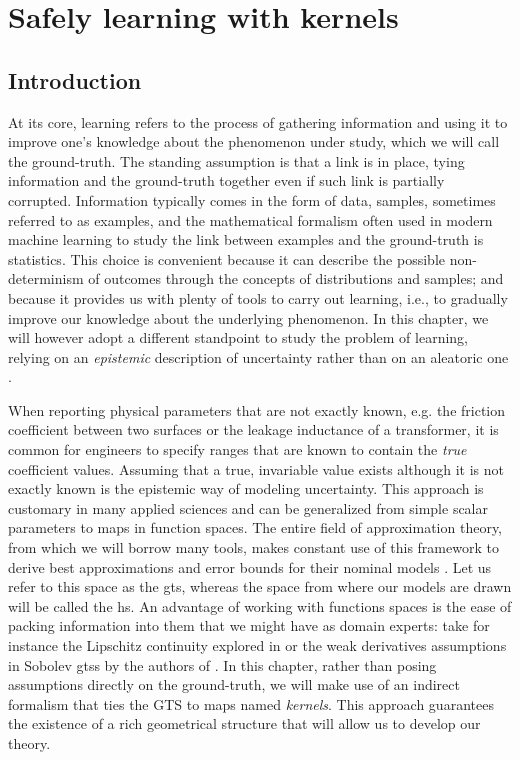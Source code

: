 \cleardoublepage
\chapter{Safely learning with kernels}

\section{Introduction}
At its core, learning refers to the process of gathering information and using it to improve one's knowledge about the phenomenon under study, which we will call the ground-truth. The standing assumption is that a link is in place, tying information and the ground-truth together even if such link is partially corrupted. Information typically comes in the form of data, samples, sometimes referred to as examples, and
the mathematical formalism often used in modern machine learning to study the link between examples and the ground-truth is statistics. This choice is convenient because it can describe the possible non-determinism of outcomes through the concepts of distributions and samples; and because it provides us with plenty of tools to carry out learning, i.e., to gradually improve our knowledge about the underlying phenomenon. In this chapter, we will however adopt a different standpoint to study the problem of learning, relying on an \textit{epistemic} description of uncertainty rather than on an aleatoric one \citep{hullermeier2021aleatoric}.

When reporting physical parameters that are not exactly known, e.g. the friction coefficient between two surfaces or the leakage inductance of a transformer, it is common for engineers to specify ranges that are known to contain the \textit{true} coefficient values. Assuming that a true, invariable value exists although it is not exactly known is the epistemic way of modeling uncertainty. This approach is customary in many applied sciences and can be generalized from simple scalar parameters to maps in function spaces. The entire field of approximation theory, from which we will borrow many tools, makes constant use of this framework to derive best approximations and error bounds for their nominal models \citep{wendland2004scattered,iske2018approximation}.  Let us refer to this space as the \ac{gts}, whereas the space from where our models are drawn will be called the \ac{hs}. An advantage of working with functions spaces is the ease of packing information into them that we might have as domain experts: take for instance the Lipschitz continuity explored in  \cite{milanese2004set,sabug2021smgo} or the weak derivatives assumptions in Sobolev \acp{gts} by the authors of \cite{novara2022nonlinear}. In this chapter, rather than posing assumptions directly on the ground-truth, we will make use of an indirect formalism that ties the GTS to maps named \textit{kernels}. This approach guarantees the existence of a rich geometrical structure that will allow us to develop our theory.

